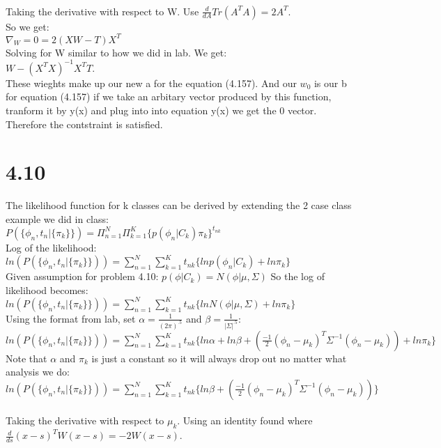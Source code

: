 \documentclass[11pt,leqno,fleqn]{article}
\begin{document}
\\
Taking the derivative with respect to W. Use $\frac{d}{dA} Tr(A^T A) = 2A^T$.\\
So we get:\\
$\nabla_W = 0 = 2(XW-T) X^T$\\
Solving for W similar to how we did in lab. We get:\\
$W - (X^T X)^{-1} X^T T$.\\
These wieghts make up our new a for the equation (4.157).  And our $w_0$ is our b for equation (4.157) if we take an arbitary vector produced by this function, tranform it by y(x) and plug into into equation y(x) we get the 0 vector. Therefore the contstraint is satisfied. 


\newpage
\section{4.10}
The likelihood function for k classes can be derived by extending the 2 case class example we did in class:\\
$P(\{ \phi_n, t_n| \{ \pi_k \}\}) = \Pi_{n=1}^N \Pi_{k =1}^K \{ p(\phi_n|C_k) \pi_k \}^{t_{nk}}$\\
Log of the likelihood:\\
$ln(P(\{ \phi_n, t_n| \{ \pi_k \}\})) = \sum_{n=1}^N \sum_{k =1}^K{t_{nk}} \{ ln p(\phi_n|C_k) + ln\pi_k \}$\\
Given assumption for problem 4.10: $p(\phi|C_k) = N(\phi| \mu, \Sigma )$ So the log of likelihood becomes:\\
$ln(P(\{ \phi_n, t_n| \{ \pi_k \}\})) = \sum_{n=1}^N \sum_{k =1}^K {t_{nk}} \{ lnN(\phi| \mu, \Sigma ) + ln\pi_k \}$\\
Using the format from lab, set $\alpha = \frac{1}{(2 \pi)^{.5}}$ and $\beta = \frac{1}{|\Sigma|^{.5}} $:\\
$ln(P(\{ \phi_n, t_n| \{ \pi_k \}\})) = \sum_{n=1}^N \sum_{k =1}^K {t_{nk}} \{ ln\alpha + ln \beta + (\frac{-1}{2}(\phi_n - \mu_k)^T\Sigma^{-1}(\phi_n - \mu_k)) + ln\pi_k \}$\\
Note that $\alpha$ and $\pi_k$  is just a constant so it will always drop out no matter what analysis we do:\\
$ln(P(\{ \phi_n, t_n| \{ \pi_k \}\})) = \sum_{n=1}^N \sum_{k =1}^K {t_{nk}} \{ ln \beta + (\frac{-1}{2}(\phi_n - \mu_k)^T\Sigma^{-1}(\phi_n - \mu_k)) \}$\\
\\
Taking the derivative with respect to $\mu_k$. Using an identity found where $\frac{d}{ds} (x-s)^T W (x - s) = -2 W (x-s)$. \\
\end{document}
